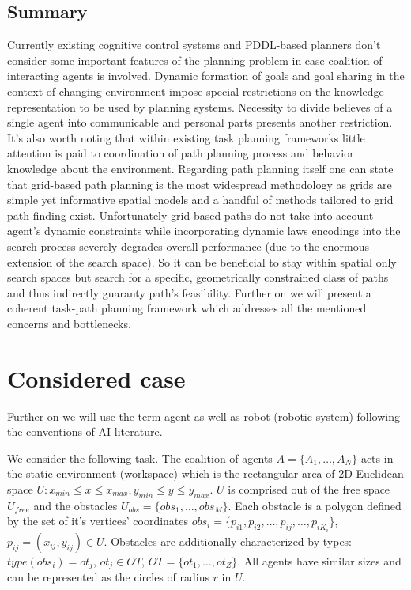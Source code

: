 \documentclass[runningheads,a4paper]{llncs}
\begin{document}
\subsection{Summary}
Currently existing cognitive control systems and PDDL-based planners don't consider some important features of the planning problem in case coalition of interacting agents is involved. Dynamic formation of goals and goal sharing in the context of changing environment impose special restrictions on the knowledge representation to be used by planning systems. Necessity to divide believes of a single agent into communicable and personal parts presents another restriction. It's also worth noting that within existing task planning frameworks little attention is paid to coordination of path planning process and behavior knowledge about the environment. Regarding path planning itself one can state that grid-based path planning is the most widespread methodology as grids are simple yet informative spatial models and a handful of methods tailored to grid path finding exist. Unfortunately grid-based paths do not take into account agent's dynamic constraints while incorporating dynamic laws encodings into the  search process severely degrades overall performance (due to the enormous extension of the search space). So it can be beneficial to stay within spatial only search spaces but search for a specific, geometrically constrained class of paths and thus indirectly guaranty path's feasibility. Further on we will present a coherent task-path planning framework which addresses all the mentioned concerns and bottlenecks.

\section{Considered case}\label{case}

Further on we will use the term agent as well as robot (robotic system) following the conventions of AI literature.

We consider the following task. The coalition of agents $A=\{A_1,\dots, A_N\}$ acts in the static  environment (workspace) which is the rectangular area of 2D Euclidean space $U: x_{min} \leq x \leq x_{max}, y_{min} \leq y \leq y_{max}$. $U$ is comprised out of the free space $U_{free}$ and the obstacles $U_{obs}=\{obs_1,\dots,obs_M\}$. Each obstacle is a polygon defined by the set of it's vertices' coordinates $obs_i=\{p_{i1}, p_{i2}, \dots, p_{ij}, \dots, p_{iK_i}\}$, $p_{ij}=(x_{ij}, y_{ij})\in U$. Obstacles are additionally characterized by types: $type(obs_i)=ot_j$, $ot_j\in OT$, $OT=\{ot_1, \dots, ot_Z\}$. All agents have similar sizes and can be represented as the circles of radius $r$ in $U$.
\end{document}
